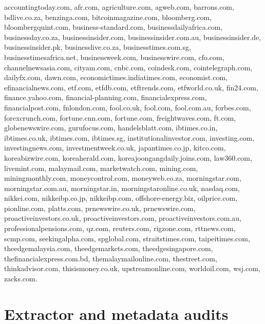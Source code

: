 {\small\raggedright accountingtoday.com, afr.com, agriculture.com,
  agweb.com, barrons.com, bdlive.co.za, benzinga.com,
  bitcoinmagazine.com, bloomberg.com, bloombergquint.com,
  business-standard.com, businessdailyafrica.com, businessday.co.za,
  businessinsider.com, businessinsider.com.au, businessinsider.de,
  businessinsider.pk, businesslive.co.za, businesstimes.com.sg,
  businesstimesafrica.net, businessweek.com, businesswire.com, cfo.com,
  channelnewsasia.com, cityam.com, cnbc.com, coindesk.com,
  cointelegraph.com, dailyfx.com, dawn.com,
  economictimes.indiatimes.com, economist.com, efinancialnews.com,
  etf.com, etfdb.com, etftrends.com, etfworld.co.uk, fin24.com,
  finance.yahoo.com, financial-planning.com, financialexpress.com,
  financialpost.com, fnlondon.com, fool.co.uk, fool.com, fool.com.au,
  forbes.com, forexcrunch.com, fortune.cnn.com, fortune.com,
  freightwaves.com, ft.com, globenewswire.com, gurufocus.com,
  handelsblatt.com, ibtimes.co.in, ibtimes.co.uk, ibtimes.com,
  ibtimes.sg, institutionalinvestor.com, investing.com,
  investingnews.com, investmentweek.co.uk, japantimes.co.jp, kitco.com,
  koreabizwire.com, koreaherald.com, koreajoongangdaily.joins.com,
  law360.com, livemint.com, malaymail.com, marketwatch.com, mining.com,
  miningmonthly.com, moneycontrol.com, moneyweb.co.za, morningstar.com,
  morningstar.com.au, morningstar.in, morningstaronline.co.uk,
  nasdaq.com, nikkei.com, nikkeibp.co.jp, nikkeibp.com,
  offshore-energy.biz, oilprice.com, pionline.com, platts.com,
  prnewswire.co.uk, prnewswire.com, proactiveinvestors.co.uk,
  proactiveinvestors.com, proactiveinvestors.com.au,
  professionalpensions.com, qz.com, reuters.com, rigzone.com,
  rttnews.com, scmp.com, seekingalpha.com, spglobal.com,
  straitstimes.com, taipeitimes.com, theedgemalaysia.com,
  theedgemarkets.com, theedgesingapore.com, thefinancialexpress.com.bd,
  themalaymailonline.com, thestreet.com, thinkadvisor.com,
thisismoney.co.uk, upstreamonline.com, worldoil.com, wsj.com, zacks.com.\par}

\section{Extractor and metadata audits}

